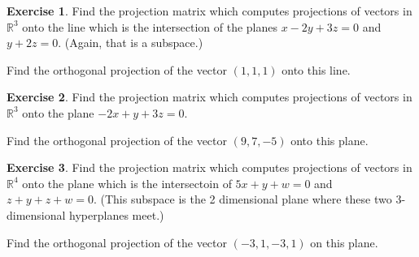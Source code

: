 \documentclass[11pt]{amsart}
\theoremstyle{definition}
\newtheorem{exercise}{Exercise}
\begin{document}
\begin{exercise}
Find the projection matrix which computes projections of vectors in $\mathbb{R}^3$ onto the line which is the intersection of the planes $x-2y+3z = 0$ and $y+2z=0$. (Again, that is a subspace.)

Find the orthogonal projection of the vector $\left(1,1,1\right)$ onto this line.
\end{exercise}

\begin{exercise}
Find the projection matrix which computes projections of vectors in $\mathbb{R}^3$ onto the plane $-2x + y +3z = 0$.

Find the orthogonal projection of the vector $\left( 9,7,-5\right)$ onto this plane.
\end{exercise}

\begin{exercise}
Find the projection matrix which computes projections of vectors in $\mathbb{R}^4$ onto the plane which is the intersectoin of $5x+y +w=0$ and $z+y+z+w=0$. (This subspace is the 2 dimensional plane where these two 3-dimensional hyperplanes meet.)

Find the orthogonal projection of the vector $\left(-3,1,-3,1\right)$ on this plane.
\end{exercise}
\end{document}
